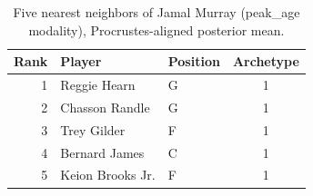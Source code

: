 \begin{table}[htbp]
  \centering\small
  \begin{tabular}{rllc}
    \toprule
    Rank & Player & Position & Archetype \\
    \midrule
    1 & Reggie Hearn & G & 1 \\
    2 & Chasson Randle & G & 1 \\
    3 & Trey Gilder & F & 1 \\
    4 & Bernard James & C & 1 \\
    5 & Keion Brooks Jr. & F & 1 \\
    \bottomrule
  \end{tabular}
  \caption{Five nearest neighbors of Jamal Murray (peak_age modality), Procrustes-aligned posterior mean.}
  \label{tab:Jamal_Murray_neighbors_peak_age}
\end{table}

